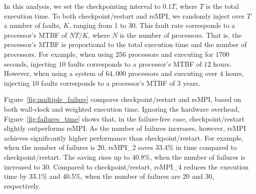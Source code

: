

In this analysis, we set the checkpointing interval to $0.1T$, where $T$ is the total execution time. To  both checkpoint/restart and rsMPI, we randomly inject over $T$ a number of faults, $K$, ranging from 1 to 30. This fault rate corresponds to a processor's MTBF of $NT/K$, where $N$ is the number of processors. That is, the processor's MTBF is proportional to the total execution time and the number of processors. For example, when using $256$ processors and executing for $1700$ seconds, injecting $10$ faults corresponds to a processor's MTBF of $12$ hours. However, 
when using a system of $64,000$ processors and executing over $4$ hours, injecting $10$ faults corresponds to a processor's MTBF of $3$ years.

Figure~\ref{fig:multiple_failure} compares checkpoint/restart and rsMPI, based on both wall-clock and weighted execution time. Ignoring the hardware overhead, Figure~\ref{fig:failures_time} shows that, in the failure-free case, checkpoint/restart slightly outperforms rsMPI. As the number of failures increases, however, rsMPI achieves significantly higher performance than checkpoint/restart. For example, when the number of failures is 20, rsMPI\_2 saves 33.4\% in time compared to checkpoint/restart. The saving rises up to 40.8\%, when the number of failures is increased to $30$. Compared to checkpoint/restart, rsMPI\_4 reduces the execution time by 33.1\% and 40.5\%, when the number of failures are 20 and 30, respectively. 

